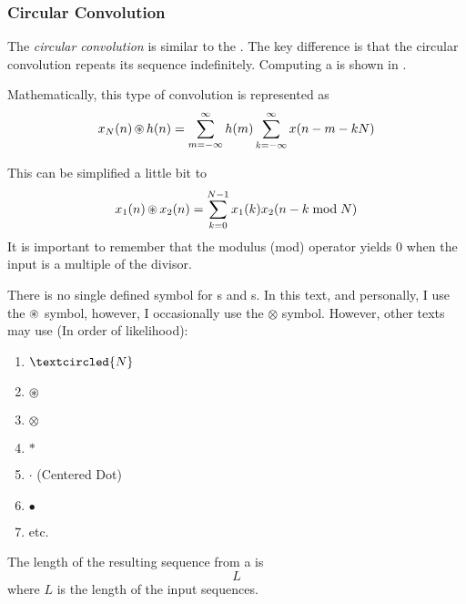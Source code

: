 \subsubsection{Circular Convolution}\label{subsubsec:DFT_Properties-Circular_Convolution}
\begin{definition}\label{def:Circular_Convolution}
  The \emph{circular convolution} is similar to the .
  The key difference is that the circular convolution repeats its sequence indefinitely.
  Computing a  is shown in .

  Mathematically, this type of convolution is represented as
  \begin{equation}\label{eq:Circular_Convolution}
    x_{N}(n) \operatorname{\circledast} h(n) = \sum\limits_{m=-\infty}^{\infty} h(m) \sum\limits_{k=-\infty}^{\infty} x(n-m-kN)
  \end{equation}

  This can be simplified a little bit to
  \begin{equation}\label{eq:Circular_Convolution-Simplified}
    x_{1}(n) \operatorname{\circledast} x_{2}(n) = \sum\limits_{k=0}^{N-1} x_{1}(k) x_{2}(n-k \bmod N)
  \end{equation}
  It is important to remember that the modulus (mod) operator yields 0 when the input is a multiple of the divisor.

  \begin{remark}
    There is no single defined symbol for s and s.
    In this text, and personally, I use the $\operatorname{\circledast}$ symbol, however, I occasionally use the $\otimes$ symbol.
    However, other texts may use (In order of likelihood):
    \begin{enumerate}[noitemsep]
    \item $\textcircled{N}$
    \item $\circledast$
    \item $\otimes$
    \item $*$
    \item $\cdot$ (Centered Dot)
    \item $\bullet$
    \item etc.
    \end{enumerate}
  \end{remark}
  
  \begin{remark}\label{rmk:Circular_Convolution_Length}
    The length of the resulting sequence from a  is
    \begin{equation}\label{eq:Circular_Convolution_Length}
      L
    \end{equation}
    where $L$ is the length of the input sequences.
  \end{remark}


\end{definition}
